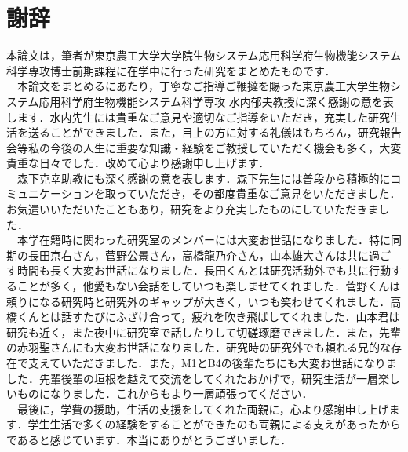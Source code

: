 \chapter*{謝辞}
本論文は，筆者が東京農工大学大学院生物システム応用科学府生物機能システム科学専攻博士前期課程に在学中に行った研究をまとめたものです．\\
　本論文をまとめるにあたり，丁寧なご指導ご鞭撻を賜った東京農工大学生物システム応用科学府生物機能システム科学専攻 水内郁夫教授に深く感謝の意を表します．水内先生には貴重なご意見や適切なご指導をいただき，充実した研究生活を送ることができました．また，目上の方に対する礼儀はもちろん，研究報告会等私の今後の人生に重要な知識・経験をご教授していただく機会も多く，大変貴重な日々でした．改めて心より感謝申し上げます．\\
　森下克幸助教にも深く感謝の意を表します．森下先生には普段から積極的にコミュニケーションを取っていただき，その都度貴重なご意見をいただきました．お気遣いいただいたこともあり，研究をより充実したものにしていただきました．\\
　本学在籍時に関わった研究室のメンバーには大変お世話になりました．特に同期の長田京右さん，菅野公景さん，高橋龍乃介さん，山本雄大さんは共に過ごす時間も長く大変お世話になりました．長田くんとは研究活動外でも共に行動することが多く，他愛もない会話をしていつも楽しませてくれました．菅野くんは頼りになる研究時と研究外のギャップが大きく，いつも笑わせてくれました．高橋くんとは話すたびにふざけ合って，疲れを吹き飛ばしてくれました．山本君は研究も近く，また夜中に研究室で話したりして切磋琢磨できました．また，先輩の赤羽聖さんにも大変お世話になりました．研究時の研究外でも頼れる兄的な存在で支えていただきました．また，M1とB4の後輩たちにも大変お世話になりました．先輩後輩の垣根を越えて交流をしてくれたおかげで，研究生活が一層楽しいものになりました．これからもより一層頑張ってください．\\
　最後に，学費の援助，生活の支援をしてくれた両親に，心より感謝申し上げます．学生生活で多くの経験をすることができたのも両親による支えがあったからであると感じています．本当にありがとうございました．
